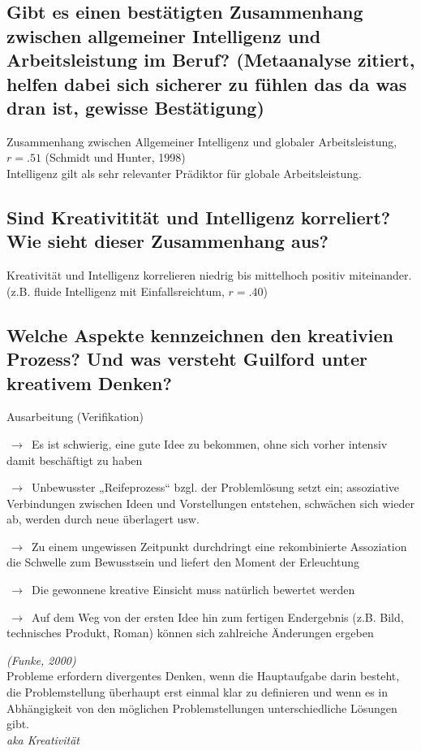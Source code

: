\documentclass[a6paper,9pt,DIV=14]{scrartcl}
\begin{document}
\subsection{Gibt es einen bestätigten Zusammenhang zwischen allgemeiner Intelligenz und Arbeitsleistung im Beruf? (Metaanalyse zitiert, helfen dabei sich sicherer zu fühlen das da was dran ist, gewisse Bestätigung)} %
    Zusammenhang zwischen Allgemeiner Intelligenz und globaler Arbeitsleistung, $r = .51$ (Schmidt und Hunter, 1998)\\
    Intelligenz gilt als sehr relevanter Prädiktor für globale Arbeitsleistung.
\subsection{Sind Kreativitität und Intelligenz korreliert? Wie sieht dieser Zusammenhang aus?}
    Kreativität und Intelligenz korrelieren niedrig bis mittelhoch positiv miteinander.\\
    (z.B. fluide Intelligenz mit Einfallsreichtum, $r = .40$)
\subsection{Welche Aspekte kennzeichnen den kreativien Prozess? Und was versteht Guilford unter kreativem Denken?} %
    \begin{labeling}{Ausarbeitung (Verifikation)}
        \item [Vorbereitung] $\,\to\,$ Es ist schwierig, eine gute Idee zu bekommen, ohne sich vorher intensiv damit beschäftigt zu haben
        \item [Inkubation] $\,\to\,$ Unbewusster „Reifeprozess“ bzgl. der Problemlösung setzt ein; assoziative Verbindungen zwischen Ideen und Vorstellungen entstehen, schwächen sich wieder ab, werden durch neue überlagert usw.
        \item [Einsicht (Inspiration)] $\,\to\,$ Zu einem ungewissen Zeitpunkt durchdringt eine rekombinierte Assoziation die Schwelle zum Bewusstsein und liefert den Moment der Erleuchtung
        \item [Bewertung] $\,\to\,$ Die gewonnene kreative Einsicht muss natürlich bewertet werden
        \item [Ausarbeitung (Verifikation)] $\,\to\,$ Auf dem Weg von der ersten Idee hin zum fertigen Endergebnis (z.B. Bild, technisches Produkt, Roman) können sich zahlreiche Änderungen ergeben
    \end{labeling}
    \textit{(Funke, 2000)}\\
    Probleme erfordern divergentes Denken, wenn die Hauptaufgabe darin besteht, die Problemstellung überhaupt erst einmal klar zu definieren und wenn es in Abhängigkeit von den möglichen Problemstellungen unterschiedliche Lösungen gibt.\\
    \textit{aka Kreativität}
\end{document}
